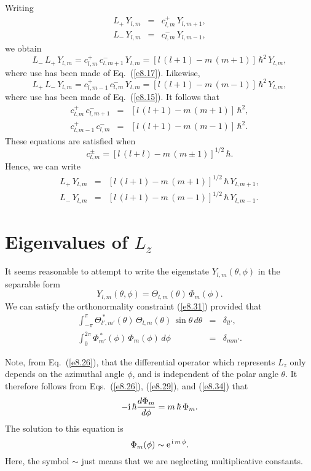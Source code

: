 Writing
\begin{eqnarray}
L_+\,Y_{l,m} &=& c_{l,m}^+\,Y_{l,m+1},\\[0.5ex]
L_-\,Y_{l,m} &=& c_{l,m}^-\,Y_{l,m-1},
\end{eqnarray}
we obtain
\begin{equation}
L_-\,L_+\,Y_{l,m} = c^+_{l,m}\,c^-_{l,m+1}\,Y_{l,m} =
[l\,(l+1)-m\,(m+1)]\,\hbar^2\,Y_{l,m},
\end{equation}
where use has been made of Eq.~(\ref{e8.17}). Likewise,
\begin{equation}
L_+\,L_-\,Y_{l,m} = c^+_{l,m-1}\,c^-_{l,m}\,Y_{l,m} = [l\,(l+1)-m\,(m-1)]\,\hbar^2\,Y_{l,m},
\end{equation}
where use has been made of Eq.~(\ref{e8.15}). It
follows that
\begin{eqnarray}
c^+_{l,m}\,c^-_{l,m+1}&=& [l\,(l+1)-m\,(m+1)]\,\hbar^2,\\[0.5ex]
c^+_{l,m-1}\,c^-_{l,m}&=& [l\,(l+1)-m\,(m-1)]\,\hbar^2.
\end{eqnarray}
These equations are satisfied when
\begin{equation}
c^\pm_{l,m} = [l\,(l+l) - m\,(m\pm 1)]^{1/2}\,\hbar.
\end{equation}
Hence, we can write
\begin{eqnarray}\label{eraise}
L_+\,Y_{l,m} &=& [l\,(l+1)-m\,(m+1)]^{1/2}\,\hbar\,Y_{l,m+1},\\[0.5ex]
L_-\,Y_{l,m} &=& [l\,(l+1)-m\,(m-1)]^{1/2}\,\hbar\,Y_{l,m-1}.\label{elow}
\end{eqnarray}

\section{Eigenvalues of $L_z$}\label{slz}
It seems reasonable to attempt to write the eigenstate $Y_{l,m}(\theta,\phi)$
in the separable form
\begin{equation}\label{e8.34}
Y_{l,m}(\theta,\phi) = \Theta_{l,m}(\theta)\,\Phi_m(\phi).
\end{equation}
We can satisfy the orthonormality constraint (\ref{e8.31}) provided that
\begin{eqnarray}
\int_{-\pi}^\pi \Theta^{\,\ast}_{l',m'}(\theta)\,\Theta_{l,m}(\theta)\,\sin\theta\,d\theta &=
& \delta_{ll'},\\[0.5ex]
\int_0^{2\pi}\Phi^{\,\ast}_{m'}(\phi)\,\Phi_{m}(\phi)\,d\phi &=
& \delta_{mm'}.\label{e8.36}
\end{eqnarray}

Note, from Eq.~(\ref{e8.26}), that the differential operator which represents
$L_z$ only depends on the azimuthal angle $\phi$, and is independent
of the polar angle $\theta$. It therefore follows from Eqs.~(\ref{e8.26}), (\ref{e8.29}), and (\ref{e8.34})
that
\begin{equation}
-{\rm i}\,\hbar\frac{d\Phi_m}{d\phi} = m\,\hbar\,\Phi_m.
\end{equation}
The solution to this equation is
\begin{equation}\label{e8.38}
\Phi_m(\phi)\sim {\rm e}^{\,{\rm i}\,m\,\phi}.
\end{equation}
Here, the  symbol $\sim$ just means that we are neglecting multiplicative constants. 

